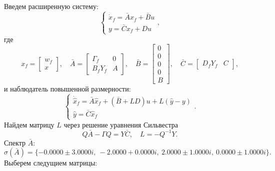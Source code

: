 Введем расширенную систему:
\begin{equation}
    \label{eq:sys2}
    \begin{cases}
        \dot x_f=\bar Ax_f+\bar B u\\
        y=\bar Cx_f+Du
    \end{cases},
\end{equation}
где
\begin{equation*}
    x_f=\begin{bmatrix}
        w_f\\x
    \end{bmatrix},\quad
    \bar A=\begin{bmatrix}
        \Gamma_f & 0 \\
        B_fY_f & A
    \end{bmatrix},\quad
    \bar B=\begin{bmatrix}
        0\\0\\0\\0\\B
    \end{bmatrix},\quad
    \bar C=\begin{bmatrix}
        D_fY_f&C
    \end{bmatrix},
\end{equation*}
и наблюдатель повышенной размерности:
\begin{equation*}
    \label{eq:obs2}
    \begin{cases}
        \dot{\hat x}_f=\bar A\hat x_f+(\bar B+LD) u+L(\hat y-y)\\
        \hat y=\bar C\hat x_f
    \end{cases}.
\end{equation*}
Найдем матрицу $L$ через решение уравнения Сильвестра 
\begin{equation*}
    Q\bar A-\Gamma Q=Y \bar C,\quad L=-Q^{-1}Y.
\end{equation*}
Спектр $\bar A$:
\begin{equation*}
    \sigma(\bar A)=\{
        -0.0000 \pm 3.0000i,\ 
-2.0000 + 0.0000i,\ 
2.0000 \pm 1.0000i,\ 
0.0000 \pm 1.0000i
    \}.
\end{equation*}
Выберем следущием матрицы:
